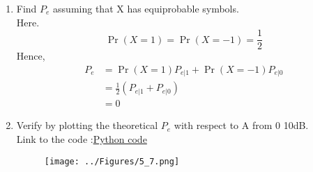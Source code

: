 \documentclass[journal,12pt,twocolumn]{IEEEtran}
\renewcommand\thesection{\arabic{section}}
\begin{document}
\begin{enumerate}[label=\thesection.\arabic*
,ref=\thesection.\theenumi]
\begin{figure}[h]
\centering
\texttt{[image: ../fig/screen55.png]}
\caption{}
\label{fig:gauss_pdf}
\end{figure}
From the Figure above :
\begin{align*}
P_{e|0} = \Pr(\hat{X} = -1|X = 1) &= 0\\
P_{e|1} = \Pr(\hat{X} = 1|X = -1) &= 0
\end{align*}

\item Find $P_e$ assuming that X has equiprobable symbols.\\
\solution Here.
\begin{equation}
\Pr(X=1) = \Pr(X=-1)=\frac{1}{2}
\end{equation}
Hence,
\begin{align*}
P_e &= \Pr(X=1) P_{e|1} + \Pr(X=-1) P_{e|0}\\
&=\frac{1}{2}(P_{e|1} + P_{e|0})\\
&= 0
\end{align*}

\item Verify by plotting the theoretical $P_e$ with respect to A from 0 10dB.\\
\solution Link to the code :\href{https://github.com/anikettsatpute/Probability-and-Random-Variable-Assignment/blob/main/code/code5_7.py}{Python code}\\

\begin{figure}[h]
\centering
\texttt{[image: ../Figures/5\_7.png]}
\caption{}
\label{fig:gauss_pdf}
\end{figure}


\end{enumerate}
\end{document}
